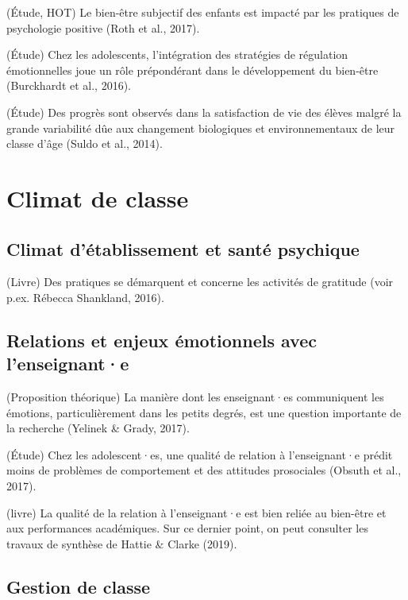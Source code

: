 \documentclass[
  french,
]{article}
\begin{document}
(Étude, HOT) Le bien-être subjectif des enfants est impacté par les pratiques de psychologie positive (Roth et al., 2017).

(Étude) Chez les adolescents, l'intégration des stratégies de régulation émotionnelles joue un rôle prépondérant dans le développement du bien-être (Burckhardt et al., 2016).

(Étude) Des progrès sont observés dans la satisfaction de vie des élèves malgré la grande variabilité dûe aux changement biologiques et environnementaux de leur classe d'âge (Suldo et al., 2014).

\hypertarget{climat-de-classe}{%
\section{Climat de classe}\label{climat-de-classe}}

\hypertarget{climat-duxe9tablissement-et-santuxe9-psychique}{%
\subsection{Climat d'établissement et santé psychique}\label{climat-duxe9tablissement-et-santuxe9-psychique}}

(Livre) Des pratiques se démarquent et concerne les activités de gratitude (voir p.ex. Rébecca Shankland, 2016).

\hypertarget{relations-et-enjeux-uxe9motionnels-avec-lenseignante}{%
\subsection{Relations et enjeux émotionnels avec l'enseignant·e}\label{relations-et-enjeux-uxe9motionnels-avec-lenseignante}}

(Proposition théorique) La manière dont les enseignant·es communiquent les émotions, particulièrement dans les petits degrés, est une question importante de la recherche (Yelinek \& Grady, 2017).

(Étude) Chez les adolescent·es, une qualité de relation à l'enseignant·e prédit moins de problèmes de comportement et des attitudes prosociales (Obsuth et al., 2017).

(livre) La qualité de la relation à l'enseignant·e est bien reliée au bien-être et aux performances académiques. Sur ce dernier point, on peut consulter les travaux de synthèse de Hattie \& Clarke (2019).

\hypertarget{gestion-de-classe}{%
\subsection{Gestion de classe}\label{gestion-de-classe}}
\end{document}

